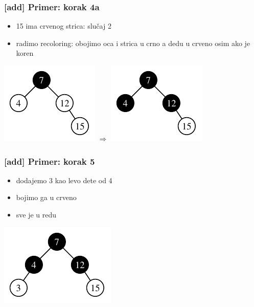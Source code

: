 \documentclass[compress]{beamer}
\begin{document}
\begin{frame}[fragile]
  \frametitle{[add] Primer: korak 4a}
  \begin{itemize}
    \item 15 ima crvenog strica: slučaj 2
    \item radimo recoloring: obojimo oca i strica u crno a dedu u crveno osim ako je koren
  \end{itemize}
  \begin{center}
    \includegraphics[scale=1.0]{asp-11-add-05.pdf} $\Rightarrow$
    \includegraphics[scale=1.0]{asp-11-add-06.pdf}
  \end{center}
\end{frame}

\begin{frame}[fragile]
  \frametitle{[add] Primer: korak 5}
  \begin{itemize}
    \item dodajemo 3 kao levo dete od 4
    \item bojimo ga u crveno
    \item sve je u redu
  \end{itemize}
  \begin{center}
    \includegraphics[scale=1.0]{asp-11-add-07.pdf}
  \end{center}
\end{frame}
\end{document}
